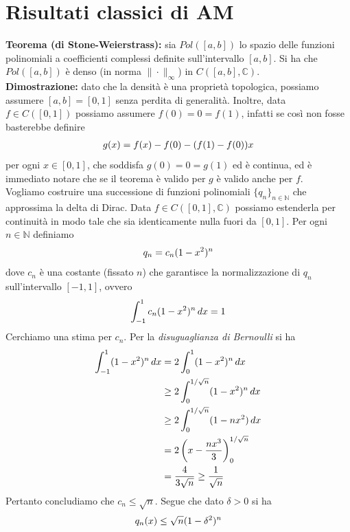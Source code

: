 \documentclass{article}
\numberwithin{equation}{subsection}
\begin{document}
\newpage
\section{Risultati classici di AM}
\textbf{Teorema (di Stone-Weierstrass):} sia $Pol([a, b])$ lo spazio delle funzioni polinomiali a coefficienti complessi definite sull'intervallo $[a, b]$. Si ha che $Pol([a, b])$ è denso (in norma $\|\cdot\|_\infty$) in $C([a, b], \mathbb{C})$. \\

\textbf{Dimostrazione:} dato che la densità è una proprietà topologica, possiamo assumere $[a, b] = [0, 1]$ senza perdita di generalità. Inoltre, data $f \in C([0, 1])$ possiamo assumere $f(0) = 0 = f(1)$, infatti se così non fosse basterebbe definire
\begin{align*}
    g(x) = f(x) - f(0) - (f(1) - f(0))x \notag
\end{align*} 
per ogni $x \in [0, 1]$, che soddisfa $g(0) = 0 = g(1)$ ed è continua, ed è immediato notare che se il teorema è valido per $g$ è valido anche per $f$. \\
Vogliamo costruire una successione di funzioni polinomiali $\{q_n\}_{n \in \mathbb{N}}$ che approssima la delta di Dirac. Data $f \in C([0, 1], \mathbb{C})$ possiamo estenderla per continuità in modo tale che sia identicamente nulla fuori da $[0, 1]$. Per ogni $n \in \mathbb{N}$ definiamo 
\begin{align*}
    q_n = c_n(1 - x^2)^n \notag
\end{align*}
dove $c_n$ è una costante (fissato $n$) che garantisce la normalizzazione di $q_n$ sull'intervallo $[-1, 1]$, ovvero 
\begin{align*}
    \int_{-1}^1 c_n(1 - x^2)^n \, dx = 1 \notag
\end{align*}
Cerchiamo una stima per $c_n$. Per la \textit{disuguaglianza di Bernoulli} si ha 
\begin{align*}
    \int_{-1}^1 (1 - x^2)^n \, dx &= 2\int_0^1 (1 - x^2)^n \, dx \notag \\
    &\geq 2\int_0^{1/\sqrt{n}} (1 - x^2)^n \, dx \notag \\
    &\geq 2\int_0^{1/\sqrt{n}} (1 - nx^2) \, dx \notag \\
    &= 2\left(x - \frac{nx^3}{3}\right)_0^{1/\sqrt{n}} \notag \\
    &= \frac{4}{3\sqrt{n}} \geq \frac{1}{\sqrt{n}} \notag
\end{align*}
Pertanto concludiamo che $c_n \leq \sqrt{n}$. Segue che dato $\delta > 0$ si ha 
\begin{align*}
    q_n(x) \leq \sqrt{n}(1 - \delta^2)^n \notag
\end{align*}
\end{document}
